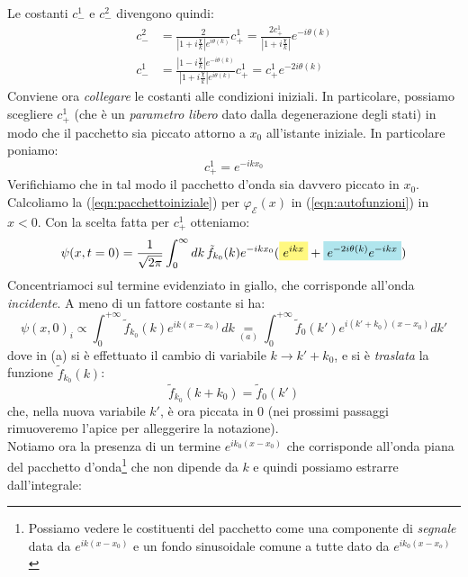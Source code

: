 \documentclass[../../FisicaTeorica.tex]{subfiles}
\begin{document}
Le costanti $c_-^1$ e $c_-^2$ divengono quindi:
\begin{align}
c^2_- &= \frac{2}{|1+i\frac{\chi}{k}|e^{i\theta(k)}}c^1_+ = \frac{2 c^1_+}{|1+i\frac{\chi}{k}|}e^{-i\theta(k)}
\label{eqn:c2-}
\\
c^1_- &= \frac{|1-i\frac{\chi}{k}|e^{-i\theta(k)}}{|1+i\frac{\chi}{k}|e^{i\theta(k)}}c^1_+ = c^1_+ e^{-2i\theta(k)}
\label{eqn:c1-}
\end{align}
Conviene ora \textit{collegare} le costanti alle condizioni iniziali. In particolare, possiamo scegliere $c^1_+$ (che è un \textit{parametro libero} dato dalla degenerazione degli stati) in modo che il pacchetto sia piccato attorno a $x_0$ all'istante iniziale. In particolare poniamo:
\begin{equation}
c^1_+ = e^{-ikx_0}
\label{eqn:c1+}
\end{equation}
Verifichiamo che in tal modo il pacchetto d'onda sia davvero piccato in $x_0$. Calcoliamo la (\ref{eqn:pacchettoiniziale}) per $\varphi_\mathcal{E}(x)$ in (\ref{eqn:autofunzioni}) in $x<0$. Con la scelta fatta per $c^1_+$ otteniamo:
\begin{equation}
\psi(x,t=0)=\frac{1}{\sqrt{2\pi}}\int_0^\infty dk\, \tilde{f}_{k_0}(k) e^{-ikx_0}(\hlc{Yellow}{e^{ikx}}+\hlc{SkyBlue}{e^{-2i\theta(k)}e^{-ikx}})
\label{eqn:pacchettonegativo}
\end{equation}
Concentriamoci sul termine evidenziato in giallo, che corrisponde all'onda \textit{incidente}. A meno di un fattore costante si ha:
\begin{equation}
\psi(x,0)_i\propto \int_0^{+\infty}\tilde{f}_{k_0}(k) e^{ik(x-x_0)} dk \underset{(a)}{=}\int_0^{+\infty} \tilde{f}_{0}(k')e^{i(k'+k_0)(x-x_0)}dk'
\label{eqn:pacchetto_max1}
\end{equation}
dove in (a) si è effettuato il cambio di variabile $k\to k'+k_0$, e si è \textit{traslata} la funzione $\tilde{f}_{k_0}(k)$:
\[
\tilde{f}_{k_0}(k+k_0) = \tilde{f}_{0}(k')
\]
che, nella nuova variabile $k'$, è ora piccata in $0$ (nei prossimi passaggi rimuoveremo l'apice per alleggerire la notazione).\\
Notiamo ora la presenza di un termine $e^{ik_0(x-x_0)}$ che corrisponde all'onda piana  del pacchetto d'onda\footnote{Possiamo vedere le costituenti del pacchetto come una componente di \textit{segnale} data da $e^{ik(x-x_0)}$ e un fondo sinusoidale comune a tutte dato da $e^{ik_0(x-x_o)}$}
 che non dipende da $k$ e quindi possiamo estrarre dall'integrale:
\end{document}
